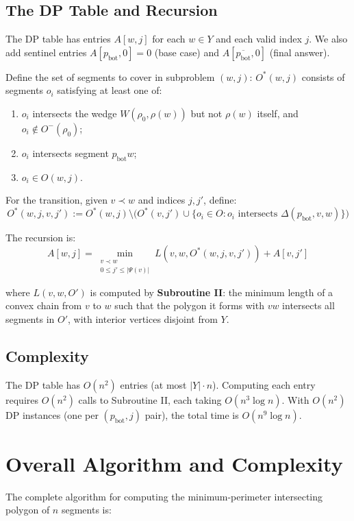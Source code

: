 \documentclass{article}
\begin{document}
\subsection{The DP Table and Recursion}

The DP table has entries $A[w, j]$ for each $w \in Y$ and each valid index $j$.
We also add sentinel entries $A[p_{\text{bot}}, 0] = 0$ (base case) and
$A[\overline{p_{\text{bot}}}, 0]$ (final answer).

Define the set of segments to cover in subproblem $(w, j)$:
$O^*(w, j)$ consists of segments $o_i$ satisfying at least one of:
\begin{enumerate}
    \item $o_i$ intersects the wedge $W(\rho_0, \rho(w))$ but not $\rho(w)$ itself,
      and $o_i \notin O^-(\rho_0)$;
  \item $o_i$ intersects segment $p_{\text{bot}} w$;
  \item $o_i \in O(w, j)$.
\end{enumerate}

For the transition, given $v \prec w$ and indices $j, j'$, define:
\[
O^*(w, j, v, j') := O^*(w, j) \setminus \bigl(O^*(v, j') \cup
\{o_i \in O : o_i \text{ intersects } \Delta(p_{\text{bot}}, v, w)\}\bigr)
\]

The recursion is:
\[
A[w, j] = \min_{\substack{v \prec w \\ 0 \le j' \le |\Psi(v)|}}
L(v, w, O^*(w, j, v, j')) + A[v, j']
\]

where $L(v, w, O')$ is computed by \textbf{Subroutine II}: the minimum length of
a convex chain from $v$ to $w$ such that the polygon it forms with $vw$ intersects
all segments in $O'$, with interior vertices disjoint from $Y$.

\subsection{Complexity}

The DP table has $O(n^2)$ entries (at most $|Y| \cdot n$). Computing each entry
requires $O(n^2)$ calls to Subroutine II, each taking $O(n^3 \log n)$. With
$O(n^2)$ DP instances (one per $(p_{\text{bot}}, j)$ pair), the total time is
$O(n^9 \log n)$.


\section{Overall Algorithm and Complexity}

The complete algorithm for computing the minimum-perimeter intersecting polygon
of $n$ segments is:
\end{document}
